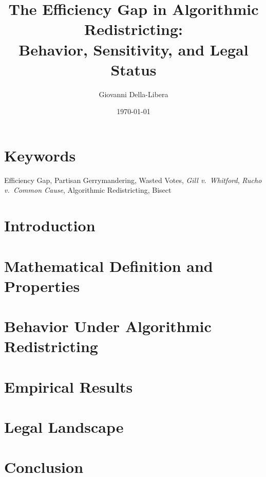 \documentclass[12pt]{article}
\title{\textbf{The Efficiency Gap in Algorithmic Redistricting:\\
Behavior, Sensitivity, and Legal Status}}
\author{Giovanni Della-Libera}
\date{\today}
\begin{document}
\maketitle

\begin{abstract}

\end{abstract}

\section*{Keywords}
Efficiency Gap, Partisan Gerrymandering, Wasted Votes, \textit{Gill v.\ Whitford},
\textit{Rucho v.\ Common Cause}, Algorithmic Redistricting, Bisect

\section{Introduction}


\section{Mathematical Definition and Properties}


\section{Behavior Under Algorithmic Redistricting}


\section{Empirical Results}


\section{Legal Landscape}


\section{Conclusion}




\end{document}
